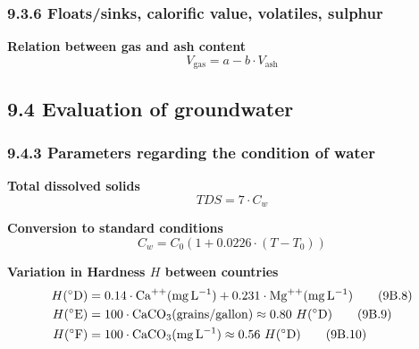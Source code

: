 \subsubsection{9.3.6 Floats/sinks, calorific value, volatiles, sulphur}
\textbf{Relation between gas and ash content}
\begin{equation*}
    V_\mathrm{gas} = a - b\cdot V_\mathrm{ash}\tag{9B.5}
\end{equation*}

\subsection{9.4 Evaluation of groundwater}
\subsubsection{9.4.3 Parameters regarding the condition of water}
\textbf{Total dissolved solids}
\begin{equation*}
    \mathit{TDS} = 7\cdot C_w\tag{9B.6}
\end{equation*}

\textbf{Conversion to standard conditions}
\begin{equation*}
    C_w = C_0 \left( 1 + 0.0226\cdot(T - T_0) \right)\tag{9B.7}
\end{equation*}

\textbf{Variation in Hardness $H$ between countries}
% 
% 
\begin{align}
    H(^\circ \mathrm{D}) & = 0.14\cdot\ce{Ca^{++}} (\SI{}{\milli\gram\per\liter}) + 0.231\cdot\ce{Mg^{++}} (\SI{}{\milli\gram\per\liter}) \tag{9B.8} \\
    H(^\circ \mathrm{E}) & = 100\cdot\ce{CaCO3} (\mathrm{grains / gallon}) \approx 0.80\ H(^\circ \mathrm{D}) \tag{9B.9}                             \\
    H(^\circ \mathrm{F}) & = 100\cdot\ce{CaCO3} (\SI{}{\milli\gram\per\liter}) \approx 0.56\ H(^\circ \mathrm{D}) \tag{9B.10}
\end{align}

